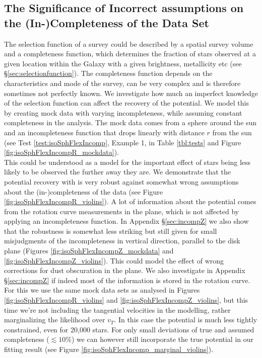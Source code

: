 \subsection{The Significance of Incorrect assumptions on the (In-)Completeness of the Data Set} \label{sec:results_incompR}

The selection function of a survey could be described by a spatial survey volume and a completeness function, which determines the fraction of stars observed at a given location within the Galaxy with a given brightness, metallicity etc (see \S\ref{sec:selectionfunction}). The completeness function depends on the characteristics and mode of the survey, can be very complex and is therefore sometimes not perfectly known. We investigate how much an imperfect knowledge of the selection function can affect the recovery of the potential. We model this by creating mock data with varying incompleteness, while assuming constant completeness in the analysis. The mock data comes from a sphere around the sun and an incompleteness function that drops linearly with distance $r$ from the sun (see Test \ref{test:isoSphFlexIncomp}, Example 1, in Table \ref{tbl:tests} and Figure \ref{fig:isoSphFlexIncompR_mockdata}).
\\This could be understood as a model for the important effect of stars being less likely to be observed the further away they are. We demonstrate that the potential recovery with \RM{} is very robust against somewhat wrong assumptions about the (in-)completeness of the data (see Figure \ref{fig:isoSphFlexIncompR_violins}). A lot of information about the potential comes from the rotation curve measurements in the plane, which is not affected by applying an incompleteness function. In Appendix \S\ref{sec:incompZ} we also show that the robustness is somewhat less striking but still given for small misjudgments of the incompleteness in vertical direction, parallel to the disk plane (Figures \ref{fig:isoSphFlexIncompZ_mockdata} and \ref{fig:isoSphFlexIncompZ_violins}). This could model the effect of wrong corrections for dust obscuration in the plane. We also investigate in Appendix \S\ref{sec:incompZ} if indeed most of the information is stored in the rotation curve. For this we use the same mock data sets as analysed in Figures \ref{fig:isoSphFlexIncompR_violins} and \ref{fig:isoSphFlexIncompZ_violins}, but this time we’re not including the tangential velocities in the modelling, rather marginalizing the likelihood over $v_T$. In this case the potential is much less tightly constrained, even for 20,000 stars. For only small deviations of true and assumed completeness ($\lesssim 10\%$) we can however still incorporate the true potential in our fitting result (see Figure \ref{fig:isoSphFlexIncomp_marginal_violins}). 



